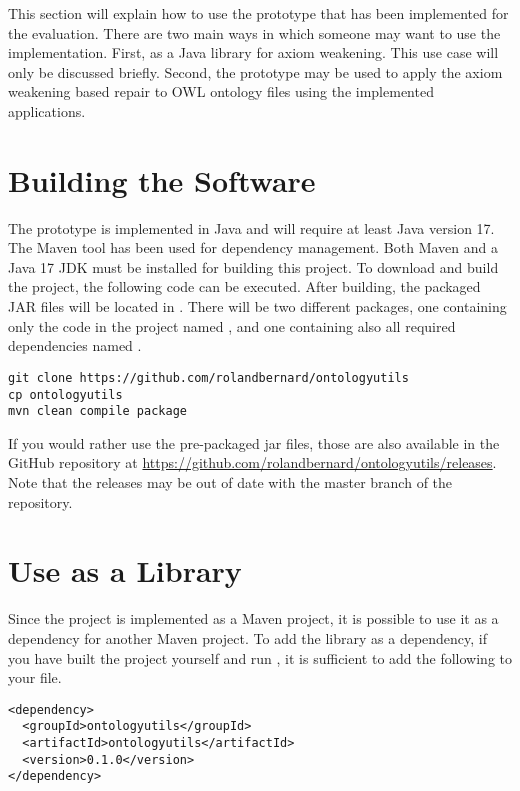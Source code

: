 
This section will explain how to use the prototype that has been implemented for the evaluation. There are two main ways in which someone may want to use the implementation. First, as a Java library for axiom weakening. This use case will only be discussed briefly. Second, the prototype may be used to apply the axiom weakening based repair to OWL ontology files using the implemented applications.

\section{Building the Software}

The prototype is implemented in Java and will require at least Java version 17. The Maven tool has been used for dependency management. Both Maven and a Java 17 JDK must be installed for building this project. To download and build the project, the following code can be executed. After building, the packaged JAR files will be located in . There will be two different packages, one containing only the code in the project named , and one containing also all required dependencies named .

\begin{lstlisting}
git clone https://github.com/rolandbernard/ontologyutils
cp ontologyutils
mvn clean compile package
\end{lstlisting}

If you would rather use the pre-packaged jar files, those are also available in the GitHub repository at \url{https://github.com/rolandbernard/ontologyutils/releases}. Note that the releases may be out of date with the master branch of the repository.

\section{Use as a Library}

Since the project is implemented as a Maven project, it is possible to use it as a dependency for another Maven project. To add the library as a dependency, if you have built the project yourself and run , it is sufficient to add the following to your  file. 

\begin{lstlisting}
<dependency>
  <groupId>ontologyutils</groupId>
  <artifactId>ontologyutils</artifactId>
  <version>0.1.0</version>
</dependency>
\end{lstlisting}

